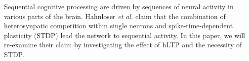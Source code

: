 Sequential cognitive processing are driven by sequences of neural activity in various parts of the brain. 
Hahnloser \textit{et al.} claim that the combination of heterosynpatic competition within single neurons and spike-time-dependent plasticity (STDP) lead the network to sequential activity. In this paper, we will re-examine their claim by investigating the effect of hLTP and the necessity of  STDP.
